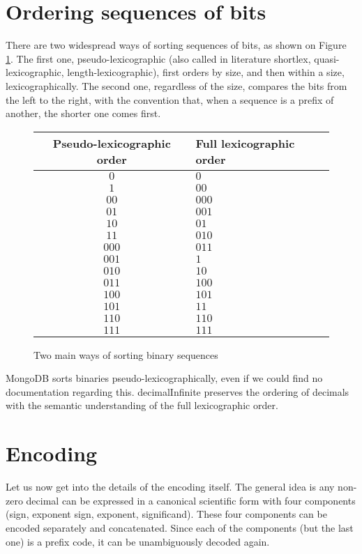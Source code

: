 \documentclass{acm_proc_article-sp}
\begin{document}
\section{Ordering sequences of bits}
\label{section-ordering}

There are two widespread ways of sorting sequences of bits, as shown on Figure \ref{figure-orders}. The first one, pseudo-lexicographic (also called in literature shortlex, quasi-lexicographic, length-lexicographic), first orders by size, and then within a size, lexicographically. The second one, regardless of the size, compares the bits from the left to the right, with the convention that, when a sequence is a prefix of another, the shorter one comes first.

\begin{figure}[p]
\caption{Two main ways of sorting binary sequences}
\label{figure-orders}
\center
\begin{tabular}{|c|l|}
\hline
Pseudo-lexicographic order & Full lexicographic order\\
\hline
$0$ & $0$ \\
$1$ & $00$ \\
$00$ & $000$ \\
$01$ & $001$ \\
$10$ & $01$ \\
$11$ & $010$ \\
$000$ & $011$ \\
$001$ & $1$ \\
$010$ & $10$ \\
$011$ & $100$ \\
$100$ & $101$ \\
$101$ & $11$ \\
$110$ & $110$ \\
$111$ & $111$ \\
\hline
\end{tabular}
\end{figure}

MongoDB sorts binaries pseudo-lexicographically, even if we could find no documentation regarding this. decimalInfinite preserves the ordering of decimals with the semantic understanding of the full lexicographic order.

\section{Encoding}
\label{section-encoding}
Let us now get into the details of the encoding itself. The general idea is any non-zero decimal can be expressed in a canonical scientific form with four components (sign, exponent sign, exponent, significand). These four components can be encoded separately and concatenated. Since each of the components (but the last one) is a prefix code, it can be unambiguously decoded again.
\end{document}
